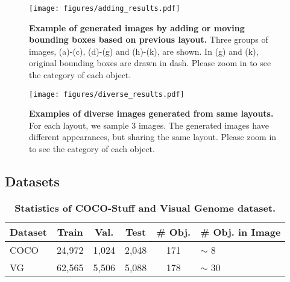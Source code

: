 \documentclass[10pt,twocolumn,letterpaper]{article}
\begin{document}
\begin{figure*}[!t]
    \begin{center}
\texttt{[image: figures/adding\_results.pdf]}
    \end{center}
    \vspace{-0.1in}
    \caption{\textbf{Example of generated images by adding or moving bounding boxes based on previous layout.} Three groups of images, (a)-(c), (d)-(g) and (h)-(k), are shown. In (g) and (k), original bounding boxes are drawn in dash. Please zoom in to see the category of each object.}
    \vspace{-0.2in}
    \label{fig:adding_results}
\end{figure*}

\begin{figure*}[!t]
    \begin{center}
\texttt{[image: figures/diverse\_results.pdf]}
    \end{center}
    \caption{\textbf{Examples of diverse images generated from same layouts.} For each layout, we sample 3 images. The generated images have different appearances, but sharing the same layout. Please zoom in to see the category of each object.}
    \vspace{-0.2in}
    \label{fig:diverse_results}
\end{figure*}

\subsection{Datasets}

\begin{table}[!t]
\footnotesize
\centering
\begin{tabular}{l|c|c|c|c|l}

\textbf{Dataset}       & \textbf{Train}  & \textbf{Val.}   & \textbf{Test}  & \textbf{\# Obj.} & \textbf{\# Obj. in Image}\\ \hline
COCO~\cite{caesar2016coco}          & 24,972 & 1,024 & 2,048 & 171      & \quad 3 $\sim$ 8               \\ \hline
VG~\cite{krishna2017visual} & 62,565 & 5,506 & 5,088 & 178      & \quad 3 $\sim$ 30             \\ 
\end{tabular}
\vspace{0.05in}
\caption{\textbf{Statistics of COCO-Stuff and Visual Genome dataset.}}
\vspace{-0.2in}
\label{tb:datasets}
\end{table}
\end{document}

